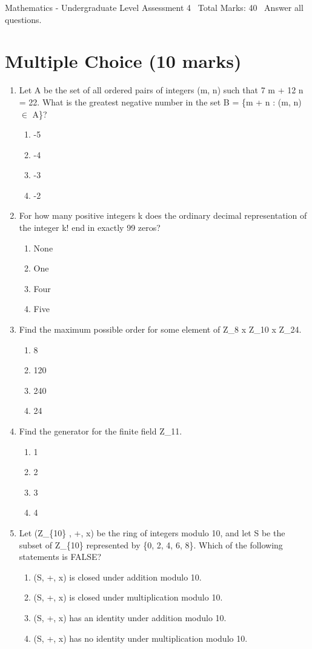 \documentclass[12pt]{article}
\begin{document}
\begin{center}
Mathematics - Undergraduate Level Assessment 4 \
Total Marks: 40 \
Answer all questions.
\end{center}

\section*{Multiple Choice (10 marks)}
\begin{enumerate}[label=\arabic*.]
\item Let A be the set of all ordered pairs of integers (m, n) such that 7 m + 12 n = 22. What is the greatest negative number in the set B = \{m + n : (m, n) \ensuremath{\in} A\}?
\begin{enumerate}[label=(\alph*)]
    \item -5
    \item -4
    \item -3
    \item -2
\end{enumerate}
\item For how many positive integers k does the ordinary decimal representation of the integer k! end in exactly 99 zeros?
\begin{enumerate}[label=(\alph*)]
    \item None
    \item One
    \item Four
    \item Five
\end{enumerate}
\item Find the maximum possible order for some element of Z\_8 x Z\_10 x Z\_24.
\begin{enumerate}[label=(\alph*)]
    \item 8
    \item 120
    \item 240
    \item 24
\end{enumerate}
\item Find the generator for the finite field Z\_11.
\begin{enumerate}[label=(\alph*)]
    \item 1
    \item 2
    \item 3
    \item 4
\end{enumerate}
\item Let (Z\_\{10\} , +, x) be the ring of integers modulo 10, and let S be the subset of Z\_\{10\} represented by \{0, 2, 4, 6, 8\}. Which of the following statements is FALSE?
\begin{enumerate}[label=(\alph*)]
    \item (S, +, x) is closed under addition modulo 10.
    \item (S, +, x) is closed under multiplication modulo 10.
    \item (S, +, x) has an identity under addition modulo 10.
    \item (S, +, x) has no identity under multiplication modulo 10.
\end{enumerate}
\end{enumerate}
\end{document}
